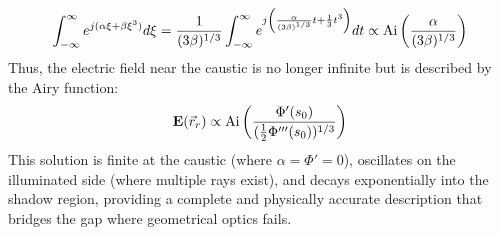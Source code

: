 \documentclass{article}
\begin{document}
\begin{equation}
    \int_{-\infty}^{\infty} e^{j (\alpha \xi + \beta \xi^3)} d\xi = \frac{1}{(3\beta)^{1/3}} \int_{-\infty}^{\infty} e^{j \left( \frac{\alpha}{(3\beta)^{1/3}} t + \frac{1}{3} t^3 \right)} dt \propto \text{Ai}\left(\frac{\alpha}{(3\beta)^{1/3}}\right)
\end{equation}
Thus, the electric field near the caustic is no longer infinite but is described by the Airy function:
\begin{equation}
    \mathbf{E}(\vec{r}_r) \propto \text{Ai}\left( \frac{\Phi'(s_0)}{( \frac{1}{2} \Phi'''(s_0) )^{1/3}} \right)
\end{equation}
This solution is finite at the caustic (where $\alpha=\Phi'=0$), oscillates on the illuminated side (where multiple rays exist), and decays exponentially into the shadow region, providing a complete and physically accurate description that bridges the gap where geometrical optics fails.
\end{document}
